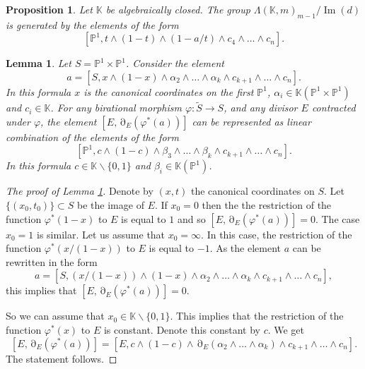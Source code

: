 \documentclass[12pt]{extarticle}
\newtheorem{lemma}[theorem]{Lemma}
\newtheorem{proposition}[theorem]{Proposition}
\def\mb{\mathbb}
\def\L{\Lambda}
\def\k{\mb K}
\def\ph{\varphi}
\def\t{\times}
\def\wt{\widetilde}
\renewcommand{\P}{{\mb P}}
\def\wdw{\wedge\dots\wedge}
\def\bs{\backslash}
\DeclareMathOperator{\ts}{\partial}
\DeclareMathOperator{\im}{Im}
\begin{document}
\begin{proposition}
\label{prop:Lambda_generated_by_Totaro_cycles}
    Let $\k$ be algebraically closed. The group $\L(\k, m)_{m-1}/\im(d)$ is generated by the elements of the form
    $$[\P^1, t\wedge (1-t)\wedge (1-a/t)\wedge c_4\wdw c_{n}].$$   
\end{proposition}

\begin{lemma}
\label{lemma:P1_genrated_by_Totaro}
    Let $S=\P^1\t\P^1$. Consider the element
    $$a=[S, x\wedge (1-x)\wedge \alpha_2\wdw \alpha_k\wedge c_{k+1}\wdw c_n].$$
    In this formula $x$ is the canonical coordinates on the first $\P^1$, $\alpha_i\in\k(\P^1\t\P^1)$ and $c_i\in \k$. For any birational morphism $\ph\colon \wt S\to S$, and any divisor $E$ contracted under $\ph$, the element $[E, \ts_E(\ph^*(a))]$ can be represented as linear combination of the elements of the form
    $$[\P^1, c\wedge (1-c)\wedge  \beta_3\wdw \beta_{k} \wedge c_{k+1}\wdw c_n].$$
    In this formula $c\in \k\bs\{0,1\}$ and $\beta_i\in \k(\P^1)$.
\end{lemma}

\begin{proof}[The proof of Lemma \ref{lemma:P1_genrated_by_Totaro}]
    Denote by $(x,t)$ the canonical coordinates on $S$. Let $\{(x_0,t_0)\}\subset S$ be the image of $E$. If $x_0=0$ then the the restriction of the function $\ph^*(1-x)$  to $E$ is equal to $1$ and so $[E, \ts_E(\ph^*(a))]=0$. The case $x_0=1$ is similar. Let us assume that $x_0=\infty$. In this case, the restriction of the function $\ph^*(x/(1-x))$ to $E$ is equal to $-1$. As the element $a$ can be rewritten in the form 
    $$a=[S, (x/(1-x))\wedge (1-x)\wedge \alpha_2\wdw \alpha_k\wedge c_{k+1}\wdw c_n],$$
    this implies that $[E, \ts_E(\ph^*(a))]=0.$
    
    So we can assume that $x_0\in \k\bs\{0,1\}$. This implies that the restriction of the function $\ph^*(x)$ to $E$ is constant. Denote this constant by $c$. We get
    $$[E, \ts_E(\ph^*(a))]=[E, c\wedge (1-c)\wedge \ts_{E}(\alpha_2\wdw \alpha_k)\wedge c_{k+1}\wdw c_n].$$
    The statement follows.
\end{proof}
\end{document}
